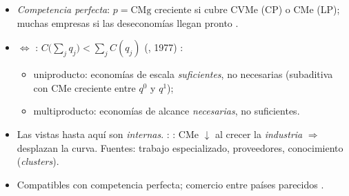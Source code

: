 \documentclass{article}
\begin{document}
\begin{columnas}
\begin{itemize}
\item \emph{Competencia perfecta}: $p=\mathrm{CMg}$ creciente si cubre CVMe (CP) o CMe (LP); muchas empresas si las deseconomías llegan pronto .
\item {} $\Leftrightarrow$ : $C\big(\sum_jq_j\big)<\sum_jC(q_j)$ (, 1977) :
  \begin{itemize}
  \item uniproducto: economías de escala \emph{suficientes}, no necesarias (subaditiva con CMe creciente entre $q^0$ y $q^1$);
  \item multiproducto: economías de alcance \emph{necesarias}, no suficientes.
  \end{itemize}
\end{itemize}
\begin{itemize}
\item Las vistas hasta aquí son \emph{internas}. : : CMe $\downarrow$ al crecer la \emph{industria} $\Rightarrow$ desplazan la curva. Fuentes: trabajo especializado, proveedores, conocimiento (\emph{clusters}).
\item Compatibles con competencia perfecta; comercio entre países parecidos .
\end{itemize}


\end{columnas}
\end{document}
